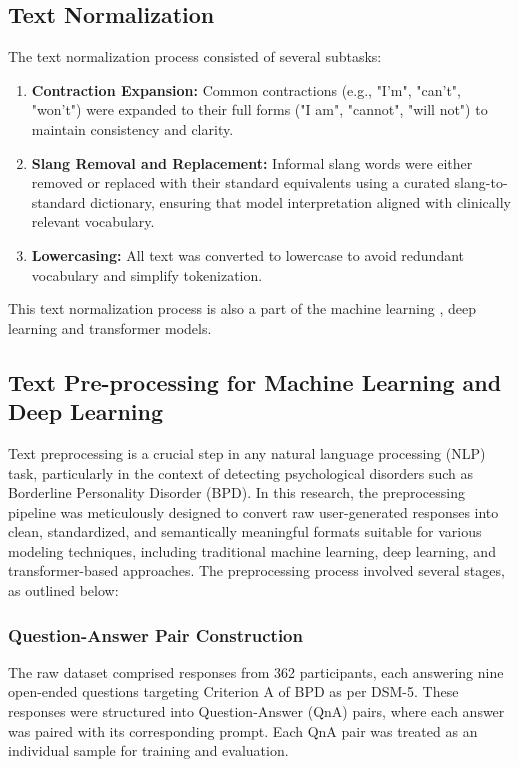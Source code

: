 \subsection{Text Normalization}
The text normalization process consisted of several subtasks:
\begin{enumerate}
    \item \textbf{Contraction Expansion:} Common contractions (e.g., "I'm", "can't", "won't") were expanded to their full forms ("I am", "cannot", "will not") to maintain consistency and clarity.
    \item \textbf{Slang Removal and Replacement:} Informal slang words were either removed or replaced with their standard equivalents using a curated slang-to-standard dictionary, ensuring that model interpretation aligned with clinically relevant vocabulary.
    \item \textbf{Lowercasing:} All text was converted to lowercase to avoid redundant vocabulary and simplify tokenization. 
\end{enumerate}
This text normalization process is also a part of the machine learning , deep learning and transformer models. 

\subsection{Text Pre-processing for Machine Learning and Deep Learning}
Text preprocessing is a crucial step in any natural language processing (NLP) task, particularly in the context of detecting psychological disorders such as Borderline Personality Disorder (BPD). In this research, the preprocessing pipeline was meticulously designed to convert raw user-generated responses into clean, standardized, and semantically meaningful formats suitable for various modeling techniques, including traditional machine learning, deep learning, and transformer-based approaches. The preprocessing process involved several stages, as outlined below:

\subsubsection{Question-Answer Pair Construction} 
The raw dataset comprised responses from 362 participants, each answering nine open-ended questions targeting Criterion A of BPD as per DSM-5. These responses were structured into Question-Answer (QnA) pairs, where each answer was paired with its corresponding prompt. Each QnA pair was treated as an individual sample for training and evaluation.

